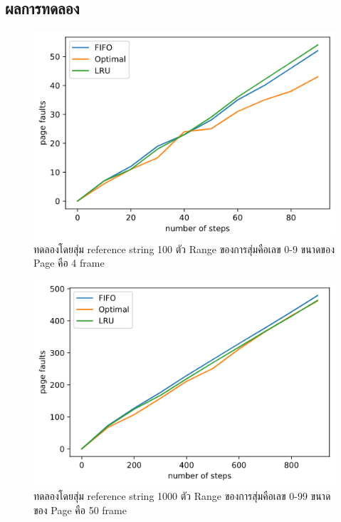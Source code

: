 \documentclass[12pt]{article}
\begin{document}
\subsection{ผลการทดลอง}

\begin{figure}[H]
\includegraphics[width=\textwidth]{1.png}
ทดลองโดยสุ่ม reference string 100 ตัว Range ของการสุ่มคือเลข 0-9 ขนาดของ Page คือ 4 frame
\end{figure}

\begin{figure}[H]
\includegraphics[width=\textwidth]{2.png}
ทดลองโดยสุ่ม reference string 1000 ตัว Range ของการสุ่มคือเลข 0-99 ขนาดของ Page คือ 50 frame
\end{figure}
\end{document}
